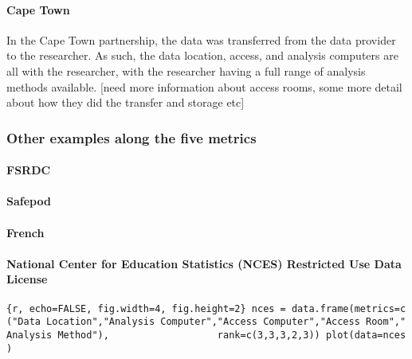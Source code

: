 \hypertarget{cape-town}{%
\paragraph{Cape Town}\label{cape-town}}

In the Cape Town partnership, the data was transferred from the data
provider to the researcher. As such, the data location, access, and
analysis computers are all with the researcher, with the researcher
having a full range of analysis methods available. {[}need more
information about access rooms, some more detail about how they did the
transfer and storage etc{]}

\hypertarget{other-examples-along-the-five-metrics}{%
\subsubsection{Other examples along the five
metrics}\label{other-examples-along-the-five-metrics}}

\hypertarget{fsrdc}{%
\paragraph{FSRDC}\label{fsrdc}}

\hypertarget{safepod}{%
\paragraph{Safepod}\label{safepod}}

\hypertarget{french}{%
\paragraph{French}\label{french}}

\hypertarget{national-center-for-education-statistics-nces-restricted-use-data-license}{%
\paragraph{National Center for Education Statistics (NCES) Restricted
Use Data
License}\label{national-center-for-education-statistics-nces-restricted-use-data-license}}

\texttt{\{r,\ echo=FALSE,\ fig.width=4,\ fig.height=2\}\ nces\ =\ data.frame(metrics=c("Data\ Location","Analysis\ Computer","Access\ Computer","Access\ Room","Analysis\ Method"),\ \ \ \ \ \ \ \ \ \ \ \ \ \ \ \ \ \ \ rank=c(3,3,3,2,3))\ plot(data=nces)}

